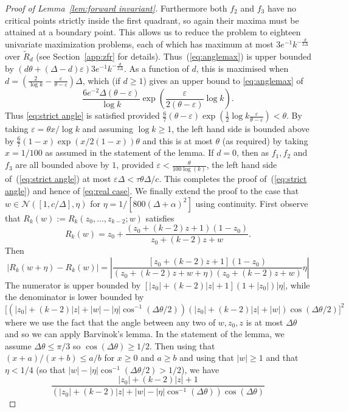 \documentclass[10pt,a4paper]{article}
\theoremstyle{definition}
\newcommand*{\eps}{\varepsilon}
\begin{document}
\begin{proof}[Proof of Lemma~\ref{lem:forward invariant}]
Furthermore both $f_2$ and $f_3$ have no critical points strictly inside the first quadrant, so again their maxima must be attained at a boundary point.
This allows us to reduce the problem to eighteen univariate maximization problems, each of which has maximum at most $3 e^{-1}k^{-\frac{d}{2\Delta}}$ over $\widetilde{R}_d$ (see Section~\ref{app:zfr} for details).
%
Thus~(\ref{eq:anglemax})  is upper bounded by  $(d\theta+(\Delta-d)\eps)3 e^{-1}k^{-\frac{d}{2\Delta}}$. As a function of $d$, this is maximised when $d = (\frac{2}{\log k} - \frac{\eps}{\theta - \eps})\Delta$, which  (if $d \geq 1$) gives an upper bound to \eqref{eq:anglemax} of 
\[
\frac{6e^{-2}\Delta(\theta - \eps)}{\log k} \exp\left(  \frac{\eps}{2(\theta - \eps)} \log k\right). 
\]
Thus \eqref{eq:strict angle} is satisfied provided $\frac{6}{7}(\theta - \eps)\exp( \frac{1}{2}\log k \frac{\eps}{\theta - \eps}) < \theta$. By taking $\eps = \theta x / \log k$ and assuming $\log k \geq 1$, the left hand side is bounded above by $\frac{6}{7} (1-x)\exp(x/2(1-x))\theta$ and this is at most $\theta$ (as required) by taking $x = 1/100$ as assumed in the statement of the lemma.   
%
%
%
%
%
%
%
%
%
If $d=0$, then as $f_1, f_2$ and $f_3$ are all bounded above by $1$, provided $\eps < \frac{\theta}{100\log(k)}$, the left hand side of~(\ref{eq:strict angle}) at most $\eps \Delta < \tau \theta \Delta/c$.
This completes the proof of~(\ref{eq:strict angle}) and hence of \eqref{eq:real case}.
%
We finally extend the proof to the case that $w\in \mathcal{N}([1,c/\Delta],\eta)$ 
for $\eta= 1/[800(\Delta + \alpha)^2]$ using continuity.
First observe that $R_k(w):=R_k(z_0, \ldots, z_{k-2};w)$ satisfies 
\[
R_k(w) = z_0 + \frac{(z_0 + (k-2)z + 1)(1 - z_0)}{z_0 + (k-2)z + w}.
\] 
Then 
\[
|R_k(w + \eta) - R_k(w)| 
= \left| \frac{[z_0 + (k-2)z + 1](1 - z_0)}{(z_0 + (k-2)z + w + \eta)(z_0 + (k-2)z + w)}\eta \right| 
%
\]
The numerator is upper bounded by  $[|z_0| + (k-2)|z| + 1](1 + |z_0|)|\eta|$, while the denominator is lower bounded by 
\[
\big[(|z_0| + (k-2)|z| + |w| - |\eta|\cos^{-1}(\Delta \theta/2))(|z_0| + (k-2)|z| + |w|)\cos(\Delta \theta/2)\big]^2
\]
where we use the fact that the angle between any two of $w, z_0, z$ is at most $\Delta \theta$ and so we can apply Barvinok's lemma. In the statement of the lemma, we assume $\Delta \theta \leq \pi / 3$ so $\cos(\Delta \theta) \geq 1/2$. Then using that $(x+a)/(x+b) \leq a/b$ for $x\geq 0$ and $a\geq b$ and using that $|w| \geq 1$ and that $\eta < 1/4$ (so that $|w| - |\eta|\cos^{-1}(\Delta \theta/2) > 1/2$), we have
\[
\frac{|z_0| + (k-2)|z| + 1}{(|z_0| + (k-2)|z| + |w| - |\eta| \cos^{-1}(\Delta \theta) ) \cos(\Delta \theta)}
\]
\end{proof}
\end{document}
